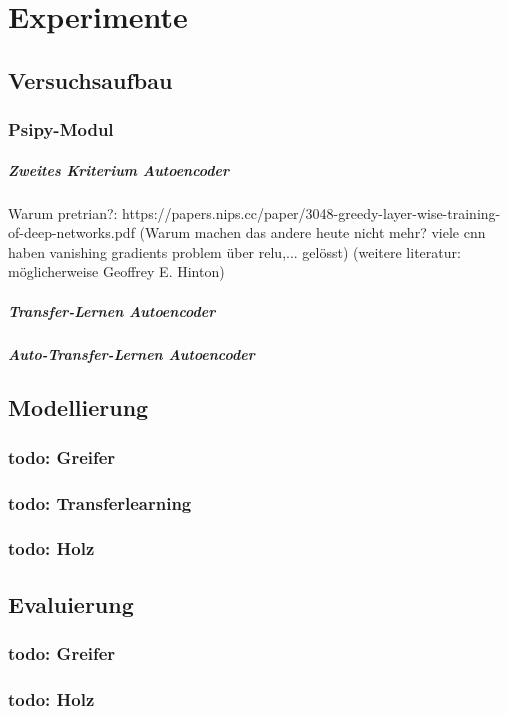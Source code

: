 \listoftodos


\chapter{Experimente}
\label{chap:Experimente}

	\section{Versuchsaufbau}
	\label{sec:Versuchsaufbau}
			\subsection{Psipy-Modul}
			
			\paragraph{Zweites Kriterium Autoencoder}
			
		Warum pretrian?:	https://papers.nips.cc/paper/3048-greedy-layer-wise-training-of-deep-networks.pdf (Warum machen das andere heute nicht mehr? viele cnn haben vanishing gradients problem  über relu,... gelösst) (weitere literatur: möglicherweise Geoffrey E. Hinton)
			\paragraph{Transfer-Lernen Autoencoder}
	
			\paragraph{Auto-Transfer-Lernen Autoencoder}
	\section{Modellierung}
	\label{sec:Modeling}
			\subsection{todo: Greifer }
			\subsection{todo: Transferlearning}
			\subsection{todo: Holz}
			
	\section{Evaluierung}
	\label{sec:Evaluierung}
		\subsection{todo: Greifer}
		\subsection{todo: Holz}